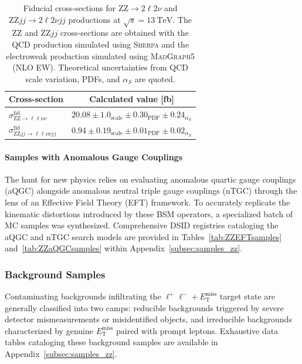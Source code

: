 \begin{table}[htbp]
\centering
\small
\renewcommand{\arraystretch}{1.4}
\begin{tabular}{l c}
\hline
\textbf{Cross-section}  & \textbf{Calculated value [fb] } \\
\hline
$\sigma^{\text{fid}}_{\text{ZZ} \to \ell\ell\nu\nu}$ & $20.08 \pm 1.0_{\text{scale}} \pm 0.30_{\text{PDF}} \pm 0.24_{\alpha_S}$ \\
$\sigma^{\text{fid}}_{\text{ZZ}jj \to \ell\ell\nu\nu jj}$ & $0.94 \pm 0.19_{\text{scale}} \pm 0.01_{\text{PDF}} \pm 0.02_{\alpha_S}$ \\
\hline
\end{tabular}
\caption{Fiducial cross-sections for $\text{ZZ} \to 2\ell 2\nu$ and $\text{ZZ}jj \to 2\ell 2\nu jj$ productions at $\sqrt{s} = 13~\text{TeV}$. The $\text{ZZ}$ and $\text{ZZ}jj$ cross-sections are obtained with the QCD production simulated using \textsc{Sherpa} and the electroweak production simulated using \textsc{MadGraph5} (NLO EW). Theoretical uncertainties from QCD scale variation, PDFs, and $\alpha_S$ are quoted.}
\label{tab:sherpa-xs}
\end{table}

\paragraph{Samples with Anomalous Gauge Couplings}
The hunt for new physics relies on evaluating anomalous quartic gauge couplings (aQGC) alongside anomalous neutral triple gauge couplings (nTGC) through the lens of an Effective Field Theory (EFT) framework. To accurately replicate the kinematic distortions introduced by these BSM operators, a specialized batch of MC samples was synthesized. Comprehensive DSID registries cataloging the aQGC and nTGC search models are provided in Tables~\ref{tab:ZZEFTsamples} and~\ref{tab:ZZaQGCsamples} within Appendix~\ref{subsec:samples_zz}.


\subsubsection{Background Samples}
Contaminating backgrounds infiltrating the $\ell^+\ell^- + E_{\text{T}}^{\text{miss}}$ target state are generally classified into two camps: reducible backgrounds triggered by severe detector mismeasurements or misidentified objects, and irreducible backgrounds characterized by genuine $E_{\text{T}}^{\text{miss}}$ paired with prompt leptons. Exhaustive data tables cataloging these background samples are available in Appendix~\ref{subsec:samples_zz}.


